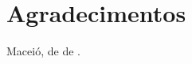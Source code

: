 \chapter*{Agradecimentos}




\vspace{15mm}

\begin{minipage}{.45\linewidth}
\begin{flushleft}
Maceió,  de  de .
\end{flushleft}
\end{minipage}
\begin{minipage}{.45\linewidth}
\end{minipage}